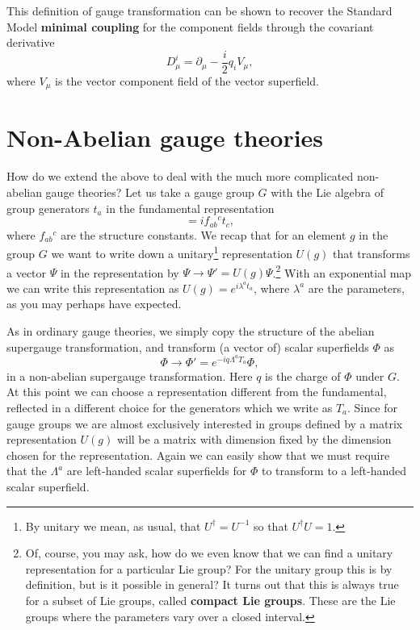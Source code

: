 \documentclass[notes.tex]{subfiles}
\begin{document}
This definition of gauge transformation can be shown to recover the Standard  Model {\bf minimal coupling} for the component fields through the covariant derivative
\[D_\mu^i = \partial_\mu -\frac{i}{2}q_iV_\mu,\]
where $V_\mu$ is the vector component field of the vector superfield.



\section{Non-Abelian gauge theories}
How do we extend the above to deal with the much more complicated non-abelian gauge theories? Let us take a gauge group $G$ with the Lie algebra of group generators $t_a$ in the fundamental representation 
\begin{equation}
[t_a, t_b] = if_{ab}{}^c t_c,\label{eq:Liealgebrawta}
\end{equation} 
where $f_{ab}{}^{c}$ are the structure constants. We recap that for an element $g$ in the group $G$ we want to write down a unitary\footnote{By unitary we mean, as usual, that $U^\dagger = U^{-1}$ so that $U^\dagger U=1$.} representation $U(g)$ that transforms a vector $\Psi$  in the representation by $\Psi \to \Psi' = U(g)\Psi$.\footnote{Of, course, you may ask, how do we even know that we can find a unitary representation for a particular Lie group? For the unitary group this is by definition, but is it possible in general? It turns out that this is always true for a subset of Lie groups, called {\bf compact Lie groups}. These are the Lie groups where the parameters vary over a closed interval.}  
With an exponential map we can write this representation as $U(g) = e^{i\lambda^a t_a}$, where $\lambda^a$ are the parameters, as you may perhaps have expected.

As in ordinary gauge theories, we simply copy the structure of the abelian supergauge transformation, and transform (a vector of) scalar superfields $\Phi$ as
\[\Phi \to \Phi'=e^{-iq \Lambda^aT_a}\Phi,\]
in a non-abelian supergauge transformation. Here $q$ is the charge of $\Phi$ under $G$. At this point we can choose a representation different from the fundamental, reflected in a different choice for the generators which we write as $T_a$. Since for gauge groups we are almost exclusively interested in groups defined by a matrix representation $U(g)$ will be a matrix with dimension fixed by the dimension chosen for the representation. Again we can easily show that we must require that the $\Lambda^a$ are left-handed scalar superfields for $\Phi$ to transform to a left-handed scalar superfield.
\end{document}

